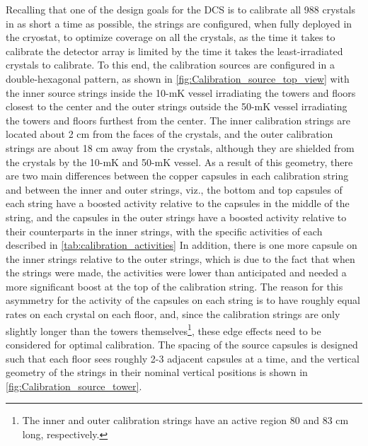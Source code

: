 Recalling that one of the design goals for the DCS is to calibrate all 988 crystals in as short a time as possible, the strings are configured, when fully deployed in the cryostat, to optimize coverage on all the crystals, as the time it takes to calibrate the detector array is limited by the time it takes the least-irradiated crystals to calibrate.
To this end, the calibration sources are configured in a double-hexagonal pattern, as shown in \autoref{fig:Calibration_source_top_view} with the inner source strings inside the 10-mK vessel irradiating the towers and floors closest to the center and the outer strings outside the 50-mK vessel irradiating the towers and floors furthest from the center.
The inner calibration strings are located about 2 cm from the faces of the crystals, and the outer calibration strings are about 18 cm away from the crystals, although they are shielded from the crystals by the 10-mK and 50-mK vessel.
As a result of this geometry, there are two main differences between the copper capsules in each calibration string and between the inner and outer strings, viz., the bottom and top capsules of each string have a boosted activity relative to the capsules in the middle of the string, and the capsules in the outer strings have a boosted activity relative to their counterparts in the inner strings, with the specific activities of each described in \autoref{tab:calibration_activities}
In addition, there is one more capsule on the inner strings relative to the outer strings, which is due to the fact that when the strings were made, the activities were lower than anticipated and needed a more significant boost at the top of the calibration string.
The reason for this asymmetry for the activity of the capsules on each string is to have roughly equal rates on each crystal on each floor, and, since the calibration strings are only slightly longer than the towers themselves\footnote{The inner and outer calibration strings have an active region 80 and 83 cm long, respectively.}, these edge effects need to be considered for optimal calibration.
The spacing of the source capsules is designed such that each floor sees roughly 2-3 adjacent capsules at a time, and the vertical geometry of the strings in their nominal vertical positions is shown in \autoref{fig:Calibration_source_tower}.

